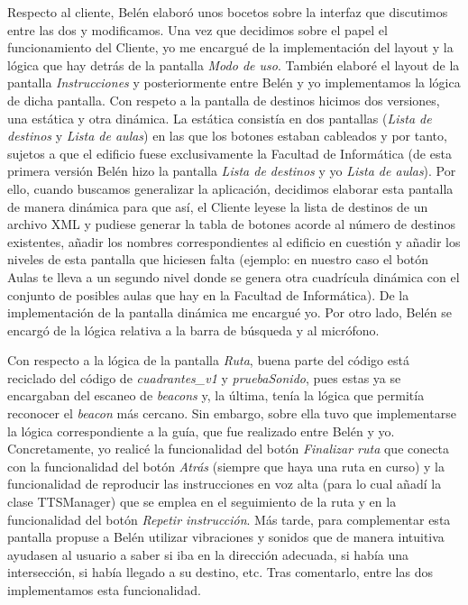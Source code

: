 Respecto al cliente, Belén elaboró unos bocetos sobre la interfaz que discutimos entre las dos y modificamos. Una vez que decidimos sobre el papel el funcionamiento del Cliente, yo me encargué de la implementación del layout y la lógica que hay detrás de la pantalla \textit{Modo de uso}. También elaboré el layout de la pantalla \textit{Instrucciones} y posteriormente entre Belén y yo implementamos la lógica de dicha pantalla. Con respeto a la pantalla de destinos hicimos dos versiones, una estática y otra dinámica. La estática consistía en dos pantallas (\textit{Lista de destinos} y \textit{Lista de aulas}) en las que los botones estaban cableados y por tanto, sujetos a que el edificio fuese exclusivamente la Facultad de Informática (de esta primera versión Belén hizo la pantalla \textit{Lista de destinos} y yo \textit{Lista de aulas}). Por ello, cuando buscamos generalizar la aplicación, decidimos elaborar esta pantalla de manera dinámica para que así, el Cliente leyese la lista de destinos de un archivo XML y pudiese generar la tabla de botones acorde al número de destinos existentes, añadir los nombres correspondientes al edificio en cuestión y añadir los niveles de esta pantalla que hiciesen falta (ejemplo: en nuestro caso el botón Aulas te lleva a un segundo nivel donde se genera otra cuadrícula dinámica con el conjunto de posibles aulas que hay en la Facultad de Informática). De la implementación de la pantalla dinámica me encargué yo. Por otro lado, Belén se encargó de la lógica relativa a la barra de búsqueda y al micrófono. 

Con respecto a la lógica de la pantalla \textit{Ruta}, buena parte del código está reciclado del código de \textit{cuadrantes\_v1} y \textit{pruebaSonido}, pues estas ya se encargaban del escaneo de \textit{beacons} y, la última, tenía la lógica que permitía reconocer el \textit{beacon} más cercano. Sin embargo, sobre ella tuvo que implementarse la lógica correspondiente a la guía, que fue realizado entre Belén y yo. Concretamente, yo realicé la funcionalidad del botón \textit{Finalizar ruta} que conecta con la funcionalidad del botón \textit{Atrás} (siempre que haya una ruta en curso) y la funcionalidad de reproducir las instrucciones en voz alta (para lo cual añadí la clase TTSManager) que se emplea en el seguimiento de la ruta y en la funcionalidad del botón \textit{Repetir instrucción}. Más tarde, para complementar esta pantalla propuse a Belén utilizar vibraciones y sonidos que de manera intuitiva ayudasen al usuario a saber si iba en la dirección adecuada, si había una intersección, si había llegado a su destino, etc. Tras comentarlo, entre las dos implementamos esta funcionalidad.

